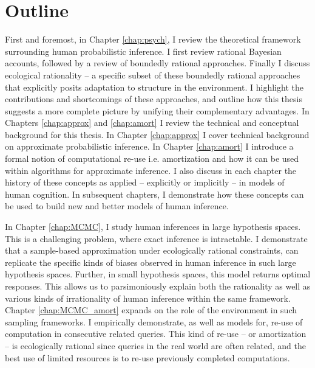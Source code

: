 \section*{Outline}

First and foremost, in Chapter \ref{chap:psych}, I review the theoretical framework surrounding human probabilistic inference. I first review rational Bayesian accounts, followed by a review of boundedly rational approaches. Finally I discuss ecological rationality -- a specific subset of these boundedly rational approaches that explicitly posits adaptation to structure in the environment. I highlight the contributions and shortcomings of these approaches, and outline how this thesis suggests a more complete picture by unifying their complementary advantages. In Chapters \ref{chap:approx} and \ref{chap:amort} I review the technical and conceptual background for this thesis. In Chapter \ref{chap:approx} I cover technical background on approximate probabilistic inference. In Chapter \ref{chap:amort} I introduce a formal notion of computational re-use i.e. amortization and how it can be used within algorithms for approximate inference. I also discuss in each chapter the history of these concepts as applied -- explicitly or implicitly -- in models of human cognition. In subsequent chapters, I demonstrate how these concepts can be used to build new and better models of human inference.


In Chapter \ref{chap:MCMC}, I study human inferences in large hypothesis spaces. This is a challenging problem, where exact inference is intractable. I demonstrate that a sample-based approximation under ecologically rational constraints, can replicate the specific kinds of biases observed in human inference in such large hypothesis spaces. 
Further, in small hypothesis spaces, this model returns optimal responses. This allows us to parsimoniously explain both the rationality as well as various kinds of irrationality of human inference within the same framework. Chapter \ref{chap:MCMC_amort} expands on the role of the environment in such sampling frameworks. I empirically demonstrate, as well as models for, re-use of computation in consecutive related queries. This kind of re-use -- or amortization -- is ecologically rational since queries in the real world are often related, and the best use of limited resources is to re-use previously completed computations.

